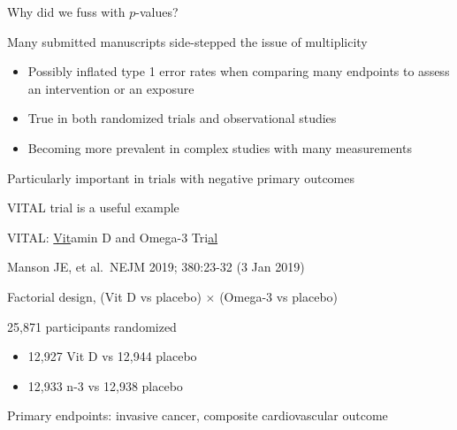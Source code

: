\documentclass[ignorenonframetext,]{beamer}
\providecommand{\tightlist}{%
  \setlength{\itemsep}{0pt}\setlength{\parskip}{0pt}}
\begin{document}
\begin{frame}{Why did we fuss with \(p\)-values?}
\protect\hypertarget{why-did-we-fuss-with-p-values}{}

Many submitted manuscripts side-stepped the issue of multiplicity

\begin{itemize}
\item
  Possibly inflated type 1 error rates when comparing many endpoints to
  assess an intervention or an exposure
\item
  True in both randomized trials and observational studies
\item
  Becoming more prevalent in complex studies with many measurements
\end{itemize}

Particularly important in trials with negative primary outcomes

VITAL trial is a useful example

\end{frame}

\begin{frame}{VITAL: \underline{Vit}amin D and Omega-3
Tri\underline{al}}
\protect\hypertarget{vital-amin-d-and-omega-3-tri}{}

Manson JE, et al.~NEJM 2019; 380:23-32 (3 Jan 2019)

Factorial design, (Vit D vs placebo) \(\times\) (Omega-3 vs placebo)

25,871 participants randomized

\begin{itemize}
\tightlist
\item
  12,927 Vit D vs 12,944 placebo\\
\item
  12,933 n-3 vs 12,938 placebo
\end{itemize}

Primary endpoints: invasive cancer, composite cardiovascular outcome

\end{frame}
\end{document}
